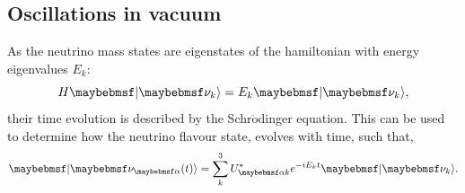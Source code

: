 \subsection{Oscillations in vacuum}

As the neutrino mass states are eigenstates of the hamiltonian with energy eigenvalues $E_{k}$:
\begin{equation} %
    H \ket{\nu_{k}} = E_{k} \ket{\nu_{k}},
    \label{eq:hamiltonian}
\end{equation} %
their time evolution is described by the Schr$\mathrm{\ddot{o}}$dinger equation. This can be used
to determine how the neutrino flavour state, evolves with time, such that,
\begin{equation} %
    \ket{\nu_{\alpha}(t)}=\sum_{k}^{3}U_{\alpha k}^{*}e^{-iE_{k}t}\ket{\nu_{k}}.
    \label{eq:time_evolution_1}
\end{equation} %

